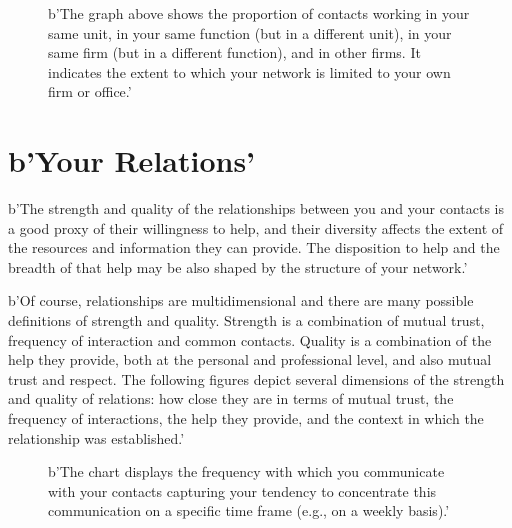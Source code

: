 \documentclass[a4paper,12pt]{article}
\begin{document}
\begin{figure}[H]
\centering
{}
\hspace{.01in}
\caption{b'The graph above shows the proportion of contacts working in your same unit, in your same function (but in a different unit), in your same firm (but in a different function), and in other firms. It indicates the extent to which your network is limited to your own firm or office.'}
\end{figure}


\section*{b'Your Relations'}


b'The strength and quality of the relationships between you and your contacts is a good proxy of their willingness to help, and their diversity affects the extent of the resources and information they can provide. The disposition to help and the breadth of that help may be also shaped by the structure of your network.'

b'Of course, relationships are multidimensional and there are many possible definitions of strength and quality. Strength is a combination of mutual trust, frequency of interaction and common contacts. Quality is a combination of the help they provide, both at the personal and professional level, and also mutual trust and respect. The following figures depict several dimensions of the strength and quality of relations: how close they are in terms of mutual trust, the frequency of interactions, the help they provide, and the context in which the relationship was established.'


\begin{figure}[H]
\centering
{}
\hspace{.01in}
\caption{b'The chart displays the frequency with which you communicate with your contacts capturing your tendency to concentrate this communication on a specific time frame (e.g., on a weekly basis).'}
\end{figure}
\end{document}
